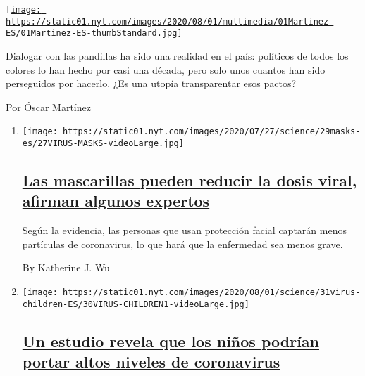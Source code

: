 \begin{enumerate}
\begin{enumerate}
    \href{/es/2020/08/02/espanol/opinion/pandillas-el-salvador.html}{\texttt{[image: https://static01.nyt.com/images/2020/08/01/multimedia/01Martinez-ES/01Martinez-ES-thumbStandard.jpg]}}

    Dialogar con las pandillas ha sido una realidad en el país:
    políticos de todos los colores lo han hecho por casi una década,
    pero solo unos cuantos han sido perseguidos por hacerlo. ¿Es una
    utopía transparentar esos pactos?

    Por Óscar Martínez
  \end{enumerate}
\end{enumerate}

\begin{enumerate}
\def\labelenumi{\arabic{enumi}.}
\item
  \texttt{[image: https://static01.nyt.com/images/2020/07/27/science/29masks-es/27VIRUS-MASKS-videoLarge.jpg]}

  \hypertarget{las-mascarillas-pueden-reducir-la-dosis-viral-afirman-algunos-expertos}{%
  \subsection{\texorpdfstring{\href{/es/2020/07/29/espanol/ciencia-y-tecnologia/proteccion-cubrebocas-coronavirus.html}{Las
  mascarillas pueden reducir la dosis viral, afirman algunos
  expertos}}{Las mascarillas pueden reducir la dosis viral, afirman algunos expertos}}\label{las-mascarillas-pueden-reducir-la-dosis-viral-afirman-algunos-expertos}}

  Según la evidencia, las personas que usan protección facial captarán
  menos partículas de coronavirus, lo que hará que la enfermedad sea
  menos grave.

  By Katherine J. Wu
\item
  \texttt{[image: https://static01.nyt.com/images/2020/08/01/science/31virus-children-ES/30VIRUS-CHILDREN1-videoLarge.jpg]}

  \hypertarget{un-estudio-revela-que-los-niuxf1os-podruxedan-portar-altos-niveles-de-coronavirus}{%
  \subsection{\texorpdfstring{\href{/es/2020/07/31/espanol/ciencia-y-tecnologia/ninos-contagio-coronavirus.html}{Un
  estudio revela que los niños podrían portar altos niveles de
  coronavirus}}{Un estudio revela que los niños podrían portar altos niveles de coronavirus}}\label{un-estudio-revela-que-los-niuxf1os-podruxedan-portar-altos-niveles-de-coronavirus}}


\end{enumerate}
